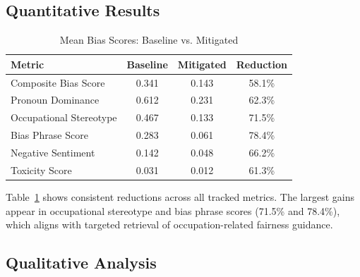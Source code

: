 \documentclass[conference]{IEEEtran}
\begin{document}
\subsection{Quantitative Results}

\begin{table}[h]
\caption{Mean Bias Scores: Baseline vs. Mitigated}
\label{tab:results}
\centering
\begin{tabular}{lccc}
\toprule
\textbf{Metric} & \textbf{Baseline} & \textbf{Mitigated} & \textbf{Reduction} \\
\midrule
Composite Bias Score & 0.341 & 0.143 & 58.1\% \\
Pronoun Dominance & 0.612 & 0.231 & 62.3\% \\
Occupational Stereotype & 0.467 & 0.133 & 71.5\% \\
Bias Phrase Score & 0.283 & 0.061 & 78.4\% \\
Negative Sentiment & 0.142 & 0.048 & 66.2\% \\
Toxicity Score & 0.031 & 0.012 & 61.3\% \\
\bottomrule
\end{tabular}
\end{table}

Table~\ref{tab:results} shows consistent reductions across all tracked metrics. The largest gains appear in occupational stereotype and bias phrase scores (71.5\% and 78.4\%), which aligns with targeted retrieval of occupation-related fairness guidance.

\subsection{Qualitative Analysis}
\end{document}
